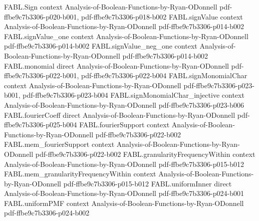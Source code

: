 \begin{theorem}
\label{FABL.FiniteFourierBasis.fourierCoeff_eq_zero_of_dependsOnly}
\leanok
{}
\proofstep
  {FABL.Sign}
  {context}
  {Analysis-of-Boolean-Functions-by-Ryan-ODonnell}
  {pdf-ffbe9c7b3306-p020-b001,
    pdf-ffbe9c7b3306-p018-b002}
\proofstep
  {FABL.signValue}
  {context}
  {Analysis-of-Boolean-Functions-by-Ryan-ODonnell}
  {pdf-ffbe9c7b3306-p014-b002}
\proofstep
  {FABL.signValue_one}
  {context}
  {Analysis-of-Boolean-Functions-by-Ryan-ODonnell}
  {pdf-ffbe9c7b3306-p014-b002}
\proofstep
  {FABL.signValue_neg_one}
  {context}
  {Analysis-of-Boolean-Functions-by-Ryan-ODonnell}
  {pdf-ffbe9c7b3306-p014-b002}
\proofstep
  {FABL.monomial}
  {direct}
  {Analysis-of-Boolean-Functions-by-Ryan-ODonnell}
  {pdf-ffbe9c7b3306-p022-b001,
    pdf-ffbe9c7b3306-p022-b004}
\proofstep
  {FABL.signMonomialChar}
  {context}
  {Analysis-of-Boolean-Functions-by-Ryan-ODonnell}
  {pdf-ffbe9c7b3306-p023-b001,
    pdf-ffbe9c7b3306-p023-b004}
\proofstep
  {FABL.signMonomialChar_injective}
  {context}
  {Analysis-of-Boolean-Functions-by-Ryan-ODonnell}
  {pdf-ffbe9c7b3306-p023-b006}
\proofstep
  {FABL.fourierCoeff}
  {direct}
  {Analysis-of-Boolean-Functions-by-Ryan-ODonnell}
  {pdf-ffbe9c7b3306-p025-b004}
\proofstep
  {FABL.fourierSupport}
  {context}
  {Analysis-of-Boolean-Functions-by-Ryan-ODonnell}
  {pdf-ffbe9c7b3306-p022-b002}
\proofstep
  {FABL.mem_fourierSupport}
  {context}
  {Analysis-of-Boolean-Functions-by-Ryan-ODonnell}
  {pdf-ffbe9c7b3306-p022-b002}
\proofstep
  {FABL.granularityFrequencyWithin}
  {context}
  {Analysis-of-Boolean-Functions-by-Ryan-ODonnell}
  {pdf-ffbe9c7b3306-p015-b012}
\proofstep
  {FABL.mem_granularityFrequencyWithin}
  {context}
  {Analysis-of-Boolean-Functions-by-Ryan-ODonnell}
  {pdf-ffbe9c7b3306-p015-b012}
\proofstep
  {FABL.uniformInner}
  {direct}
  {Analysis-of-Boolean-Functions-by-Ryan-ODonnell}
  {pdf-ffbe9c7b3306-p024-b001}
\proofstep
  {FABL.uniformPMF}
  {context}
  {Analysis-of-Boolean-Functions-by-Ryan-ODonnell}
  {pdf-ffbe9c7b3306-p024-b002}

\end{theorem}
